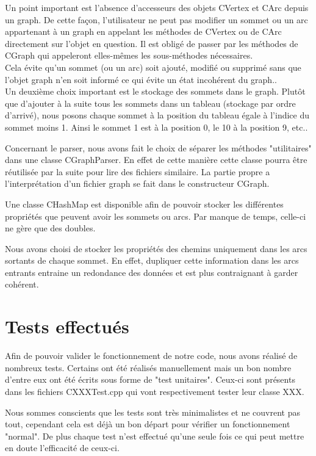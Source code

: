 		Un point important est l'absence d'accesseurs des objets CVertex et CArc depuis un graph. De cette façon, l'utilisateur ne peut pas modifier un sommet ou un arc appartenant à un graph en appelant les méthodes de CVertex ou de CArc directement sur l'objet en question. Il est obligé de passer par les méthodes de CGraph qui appeleront elles-mêmes les sous-méthodes nécessaires.\\
		Cela évite qu'un sommet (ou un arc) soit ajouté, modifié ou supprimé sans que l'objet graph n'en soit informé ce qui évite un état incohérent du graph..\\
		
		Un deuxième choix important est le stockage des sommets dans le graph. Plutôt que d'ajouter à la suite tous les sommets dans un tableau (stockage par ordre d'arrivé), nous posons chaque sommet à la position du tableau égale à l'indice du sommet moins 1. Ainsi le sommet 1 est à la position 0, le 10 à la position 9, etc..
		
	
		Concernant le parser, nous avons fait le choix de séparer les méthodes "utilitaires" dans une classe CGraphParser. En effet de cette manière cette classe pourra être réutilisée par la suite pour lire des fichiers similaire. La partie propre a l'interprétation d'un fichier graph se fait dans le constructeur CGraph.
		
		Une classe CHashMap est disponible afin de pouvoir stocker les différentes propriétés que peuvent avoir les sommets ou arcs. Par manque de temps, celle-ci ne gère que des doubles.
		
		Nous avons choisi de stocker les propriétés des chemins uniquement dans les arcs sortants de chaque sommet. En effet, dupliquer cette information dans les arcs entrants entraine un redondance des données et est plus contraignant à garder cohérent.
	\chapter{Tests effectués}
		Afin de pouvoir valider le fonctionnement de notre code, nous avons réalisé de nombreux tests. Certains ont été réalisés manuellement mais un bon nombre d'entre eux ont été écrits sous forme de "test unitaires". Ceux-ci sont présents dans les fichiers CXXXTest.cpp qui vont respectivement tester leur classe XXX.
		
		Nous sommes conscients que les tests sont très minimalistes et ne couvrent pas tout, cependant cela est déjà un bon départ pour vérifier un fonctionnement "normal". De plus chaque test n'est effectué qu'une seule fois ce qui peut mettre en doute l'efficacité de ceux-ci.
		
